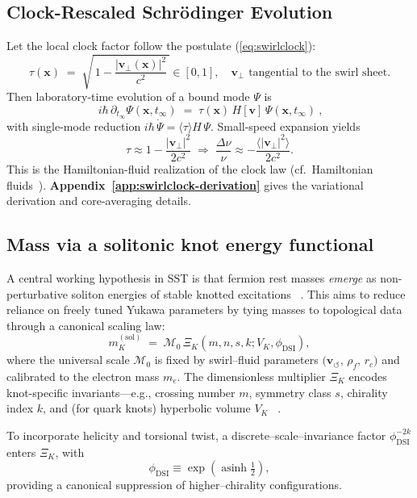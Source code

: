 \documentclass[10pt,reprint,aps,onecolumn,nofootinbib]{revtex4-2}
\begin{document}
    \subsection*{Clock-Rescaled Schrödinger Evolution}
        Let the local clock factor follow the postulate (\ref{eq:swirlclock}):
        \[
            \tau(\mathbf{x}) \;=\; \sqrt{\,1-\frac{|\mathbf{v}_\perp(\mathbf{x})|^{2}}{c^{2}}\,}\in[0,1],
            \quad \mathbf{v}_\perp \text{ tangential to the swirl sheet.}
        \]
        Then laboratory-time evolution of a bound mode \(\Psi\) is
        \[
            \boxed{~ i\hbar\,\partial_{t_\infty}\Psi(\mathbf{x},t_\infty)
            \;=\; \tau(\mathbf{x})\,H[\mathbf{v}]\,\Psi(\mathbf{x},t_\infty) ~},
        \]
        with single-mode reduction \(i\hbar\,\dot\Psi=\langle\tau\rangle H\,\Psi\).
        Small-speed expansion yields
        \[
            \tau \approx 1-\frac{|\mathbf{v}_\perp|^{2}}{2c^{2}}
            \;\Rightarrow\;
            \frac{\Delta\nu}{\nu} \approx -\frac{\langle|\mathbf{v}_\perp|^{2}\rangle}{2c^{2}}.
        \]
        This is the Hamiltonian-fluid realization of the clock law (cf.\ Hamiltonian fluids~\cite{Salmon1988,Morrison1998}).
        \textbf{Appendix~\ref{app:swirlclock-derivation}} gives the variational derivation and core-averaging details.


    \subsection*{Mass via a solitonic knot energy functional}
        A central working hypothesis in SST is that fermion rest masses \emph{emerge} as non-perturbative soliton energies of stable knotted excitations~ \cite{sstLagrangian}. This aims to reduce reliance on freely tuned Yukawa parameters by tying masses to topological data through a canonical scaling law:
        \begin{equation} \label{eq:masslaw}
            m_K^{(\mathrm{sol})} \;=\; \mathcal{M}_0 \,\Xi_K(m,n,s,k;V_K,\phi_{\mathrm{DSI}}),
        \end{equation}
        where the universal scale $\mathcal{M}_0$ is fixed by swirl–fluid parameters $\big(\mathbf{v}_{\!\boldsymbol{\circlearrowleft}},\,\rho_{\!f},\,r_c\big)$ and calibrated to the electron mass $m_e$. The dimensionless multiplier $\Xi_K$ encodes knot-specific invariants—e.g., crossing number $m$, symmetry class $s$, chirality index $k$, and (for quark knots) hyperbolic volume $V_K$~ \cite{sstLagrangian}.

        To incorporate helicity and torsional twist, a discrete–scale–invariance factor $\phi_{\mathrm{DSI}}^{-2k}$ enters $\Xi_K$, with
        \[
            \phi_{\mathrm{DSI}} \equiv \exp\!\left(\operatorname{asinh}\tfrac12\right),
        \]
        providing a canonical suppression of higher–chirality configurations.
\end{document}
